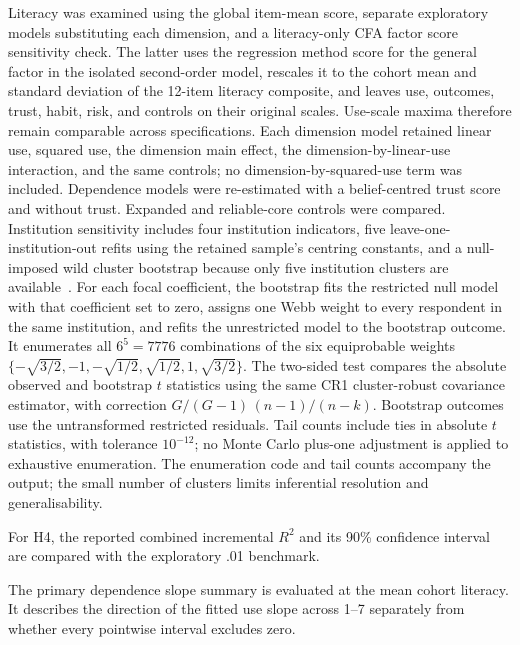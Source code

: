 \documentclass[sustainability,article,accept,moreauthors]{Definitions/mdpi}
\begin{document}
Literacy was examined using the global item-mean score, separate exploratory models substituting each dimension, and a literacy-only CFA factor score sensitivity check. The latter uses the regression method score for the general factor in the isolated second-order model, rescales it to the cohort mean and standard deviation of the 12-item literacy composite, and leaves use, outcomes, trust, habit, risk, and controls on their original scales. Use-scale maxima therefore remain comparable across specifications. Each dimension model retained linear use, squared use, the dimension main effect, the dimension-by-linear-use interaction, and the same controls; no dimension-by-squared-use term was included. Dependence models were re-estimated with a belief-centred trust score and without trust. Expanded and reliable-core controls were compared. Institution sensitivity includes four institution indicators, five leave-one-institution-out refits using the retained sample's centring constants, and a null-imposed wild cluster bootstrap because only five institution clusters are available~\cite{cameron2008}. For each focal coefficient, the bootstrap fits the restricted null model with that coefficient set to zero, assigns one Webb weight to every respondent in the same institution, and refits the unrestricted model to the bootstrap outcome. It enumerates all $6^5=7776$ combinations of the six equiprobable weights $\{-\sqrt{3/2},-1,-\sqrt{1/2},\sqrt{1/2},1,\sqrt{3/2}\}$. The two-sided test compares the absolute observed and bootstrap $t$ statistics using the same CR1 cluster-robust covariance estimator, with correction $G/(G-1)\,(n-1)/(n-k)$. Bootstrap outcomes use the untransformed restricted residuals. Tail counts include ties in absolute $t$ statistics, with tolerance $10^{-12}$; no Monte Carlo plus-one adjustment is applied to exhaustive enumeration. The enumeration code and tail counts accompany the output; the small number of clusters limits inferential resolution and generalisability.

For H4, the reported combined incremental $R^2$ and its 90\% confidence interval are compared with the exploratory .01 benchmark.

The primary dependence slope summary is evaluated at the mean cohort literacy. It describes the direction of the fitted use slope across 1--7 separately from whether every pointwise interval excludes zero.

\end{document}
